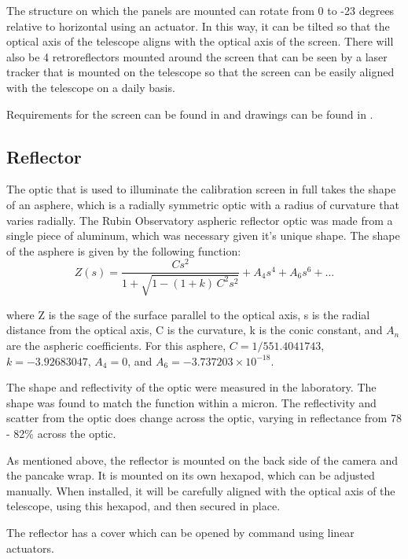 \documentclass[SE,authoryear,lsstdraft,toc]{lsstdoc}
\begin{document}
The structure on which the panels are mounted can rotate from 0 to -23 degrees
relative to horizontal using an actuator. In this way, it can be tilted so that
the optical axis of the telescope aligns with the optical axis of the
screen. There will also be 4 retroreflectors mounted around the screen that can
be seen by a laser tracker that is mounted on the telescope so that the screen
can be easily aligned with the telescope on a daily basis.


Requirements for the screen can be found in  and drawings can be found in .

\subsection{Reflector}

The optic that is used to illuminate the calibration screen in full takes the
shape of an asphere, which is a radially symmetric optic with a radius of
curvature that varies radially. The Rubin Observatory aspheric reflector optic
was made from a single piece of aluminum, which was necessary given it's unique
shape. The shape of the asphere is given by the following function:
%
\begin{equation}
Z(s) = \frac{C s^{2}}{1+\sqrt{1-(1+k)\,C^{2}s^{2}}} + A_{4}s^{4} + A_{6}s^{6} + ...
\end{equation}


where Z is the sage of the surface parallel to the optical axis, s is the radial distance from the optical axis, C is the curvature, k is the conic constant, and $A_{n}$ are the aspheric coefficients.
 For this asphere, $C=1/551.4041743$, $k=-3.92683047$, $A_{4}=0$, and $A_{6} = -3.737203\times10^{-18}$.

The shape and reflectivity of the optic were measured in the laboratory. The shape was found to match the function within a micron. The reflectivity and scatter from the optic does change across the optic, varying in reflectance from 78 - 82\% across the optic.

As mentioned above, the reflector is mounted on the back side of the camera and the pancake wrap. It is mounted on its own hexapod, which can be adjusted manually. When installed, it will be carefully aligned with the optical axis of the telescope, using this hexapod, and then secured in place.

The reflector has a cover which can be opened by command using linear actuators.
\end{document}
